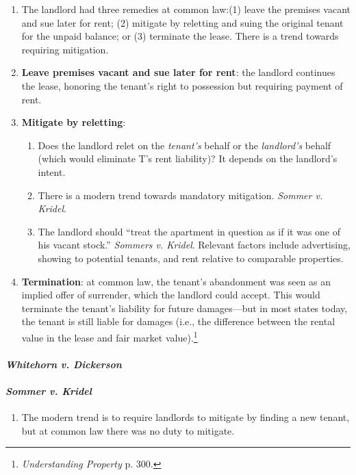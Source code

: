 \begin{enumerate}
    \item The landlord had three remedies at common law:(1) leave the premises 
    vacant and sue later for rent; (2) mitigate by reletting and suing the 
    original tenant for the unpaid balance; or (3) terminate the lease. There 
    is a trend towards requiring mitigation.
    \item \textbf{Leave premises vacant and sue later for rent}: the landlord 
    continues the lease, honoring the tenant's right to possession but 
    requiring payment of rent.
    \item \textbf{Mitigate by reletting}:
    \begin{enumerate}
        \item Does the landlord relet on the \emph{tenant's} behalf or the 
        \emph{landlord's} behalf (which would eliminate T's rent liability)? 
        It depends on the landlord's intent.
        \item There is a modern trend towards mandatory mitigation. 
        \emph{Sommer v. Kridel}.
        \item The landlord should ``treat the apartment in question as if it 
        was one of his vacant stock.'' \emph{Sommers v.  Kridel}.  Relevant 
        factors include advertising, showing to potential tenants, and rent 
        relative to comparable properties.
    \end{enumerate}
    \item \textbf{Termination}: at common law, the tenant's abandonment was 
    seen as an implied offer of surrender, which the landlord could accept. 
    This would terminate the tenant's liability for future damages---but in 
    most states today, the tenant is still liable for damages (i.e., the 
    difference between the rental value in the lease and fair market 
    value).\footnote{\emph{Understanding Property} p. 300.}
\end{enumerate}

\paragraph{\emph{Whitehorn v. Dickerson}} 

\paragraph{\emph{Sommer v. Kridel}}

\begin{enumerate}
    \item The modern trend is to require landlords to mitigate by finding a 
    new tenant, but at common law there was no duty to mitigate.
\end{enumerate}

